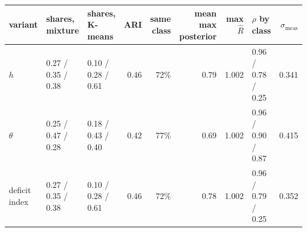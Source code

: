 \begin{tabular}{lllrrrrlr}
\toprule
variant & shares, mixture & shares, K-means & ARI & same class & mean max posterior & max $\hat R$ & $\rho$ by class & $\sigma_{\text{meas}}$ \\
\midrule
$h$ & 0.27 / 0.35 / 0.38 & 0.10 / 0.28 / 0.61 & 0.46 & 72\% & 0.79 & 1.002 & 0.96 / 0.78 / 0.25 & 0.341 \\
$\theta$ & 0.25 / 0.47 / 0.28 & 0.18 / 0.43 / 0.40 & 0.42 & 77\% & 0.69 & 1.002 & 0.96 / 0.90 / 0.87 & 0.415 \\
deficit index & 0.27 / 0.35 / 0.38 & 0.10 / 0.28 / 0.61 & 0.46 & 72\% & 0.78 & 1.002 & 0.96 / 0.79 / 0.25 & 0.352 \\
\bottomrule
\end{tabular}
